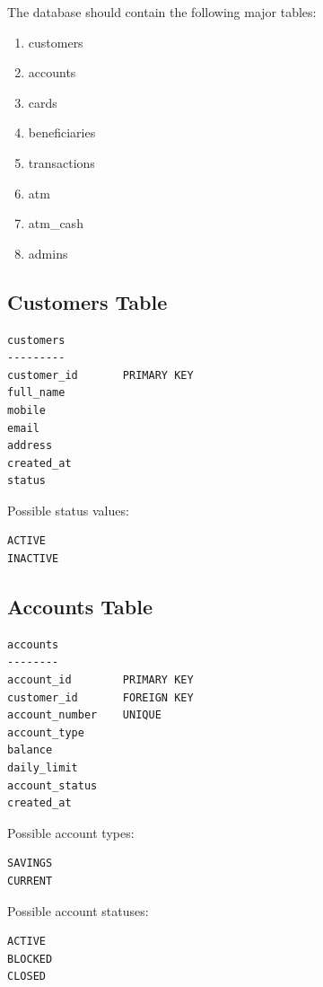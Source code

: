 \documentclass[12pt,a4paper]{article}
\begin{document}
The database should contain the following major tables:

\begin{enumerate}
    \item customers
    \item accounts
    \item cards
    \item beneficiaries
    \item transactions
    \item atm
    \item atm\_cash
    \item admins
\end{enumerate}


\subsection{Customers Table}

\begin{verbatim}
customers
---------
customer_id       PRIMARY KEY
full_name
mobile
email
address
created_at
status
\end{verbatim}

Possible status values:

\begin{verbatim}
ACTIVE
INACTIVE
\end{verbatim}


\subsection{Accounts Table}

\begin{verbatim}
accounts
--------
account_id        PRIMARY KEY
customer_id       FOREIGN KEY
account_number    UNIQUE
account_type
balance
daily_limit
account_status
created_at
\end{verbatim}

Possible account types:

\begin{verbatim}
SAVINGS
CURRENT
\end{verbatim}

Possible account statuses:

\begin{verbatim}
ACTIVE
BLOCKED
CLOSED
\end{verbatim}
\end{document}
